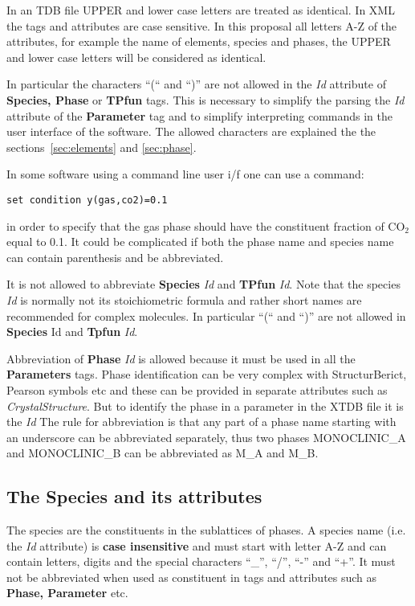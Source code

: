\documentclass{article}
\begin{document}
In an TDB file UPPER and lower case letters are treated as identical.
In XML the tags and attributes are case sensitive.  In this proposal
all letters A-Z of the attributes, for example the name of elements,
species and phases, the UPPER and lower case letters will be
considered as identical.

In particular the characters ``(`` and ``)'' are not allowed in the
{\em Id} attribute of {\bf Species, Phase} or {\bf TPfun} tags.  This
is necessary to simplify the parsing the {\em Id} attribute of the
{\bf Parameter} tag and to simplify interpreting commands in the user
interface of the software.  The allowed characters are explained the
the sections~\ref{sec:elements} and \ref{sec:phase}.

In some software using a command line user i/f one can use a command:

\vspace{-3mm}
\begin{verbatim}
set condition y(gas,co2)=0.1
\end{verbatim}
\noindent
in order to specify that the gas phase should have the constituent
fraction of CO$_2$ equal to 0.1.  It could be complicated if both the
phase name and species name can contain parenthesis and be
abbreviated.

It is not allowed to abbreviate {\bf Species} {\em Id} and {\bf TPfun}
{\em Id}.  Note that the species {\em Id} is normally not its
stoichiometric formula and rather short names are recommended for
complex molecules.  In particular ``(`` and ``)'' are not allowed in
{\bf Species} {\rm Id} and {\bf Tpfun} {\em Id}.

Abbreviation of {\bf Phase} {\em Id} is allowed because it must be
used in all the {\bf Parameters} tags.  Phase identification can be very
complex  with StructurBerict, Pearson symbols etc and these can be
provided in separate attributes such as {\em CrystalStructure}.  But to
identify the phase in a parameter in the XTDB file it is the {\em Id} 
The rule for abbreviation is
that any part of a phase name starting with an underscore can be
abbreviated separately, thus two phases MONOCLINIC\_A and
MONOCLINIC\_B can be abbreviated as M\_A and M\_B.

\subsection{The Species and its attributes}\label{sec:speciesID}

The species are the constituents in the sublattices of phases.  A
species name (i.e. the {\em Id} attribute) is {\bf case insensitive}
and must start with letter A-Z and can contain letters, digits and the
special characters ``\_'', ``/'', ``-'' and ``+''.  It must not be
abbreviated when used as constituent in tags and attributes such as
{\bf Phase, Parameter} etc.
\end{document}
